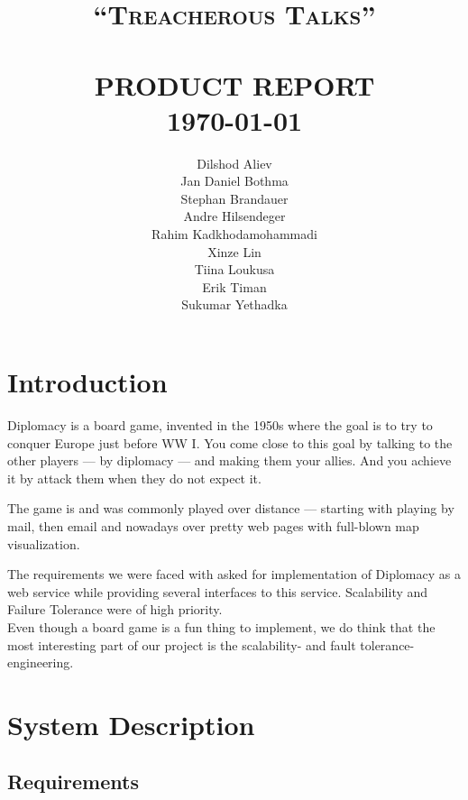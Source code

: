 \documentclass[11pt,a4paper]{report}
\title{    \normalsize \textsc{``Treacherous Talks''}   %
             \\[2.0cm]                                  %
            \HRule{0.5pt} \\                            %
            \LARGE \textbf{\uppercase{Product Report}}   %
            \HRule{2pt} \\ [0.5cm]                      %
            \normalsize \today                          %
        }
\author{Dilshod Aliev\\
        Jan Daniel Bothma\\
        Stephan Brandauer\\
        Andre Hilsendeger\\
        Rahim Kadkhodamohammadi\\
        Xinze Lin\\
        Tiina Loukusa\\
        Erik Timan\\
        Sukumar Yethadka\\
        }
\makeatletter
\newcommand{\hi}[1]{{\color{red}\em #1\/}\\}
\def\printtitle{
    {\centering \@title\par}}
\def\printauthor{
    {\centering \large \@author}}
\makeatother
\begin{document}
\thispagestyle{empty}                %

\printtitle
\vfill
\printauthor

\tableofcontents


\chapter{Introduction}
Diplomacy\cite{diplomacy} is a board game, invented in the 1950s where the goal
is to try to conquer Europe just before WW I. You come close to this goal by
talking to the other players --- by diplomacy --- and making them your allies.
And you achieve it by attack them when they do not expect it.

The game is and was commonly played over distance --- starting with playing by
mail, then email and nowadays over pretty web pages with full-blown map
visualization.

The requirements we were faced with asked for implementation of Diplomacy as a
web service while providing several interfaces to this service. Scalability and
Failure Tolerance were of high priority. \\
Even though a board game is a fun thing to implement, we do think that the most
interesting part of our project is the scalability- and fault tolerance-
engineering.

\chapter{System Description}

\section{Requirements}
\end{document}
